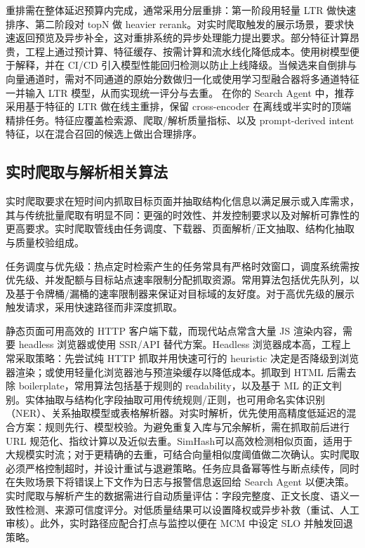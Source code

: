 重排需在整体延迟预算内完成，通常采用分层重排：第一阶段用轻量 LTR 做快速排序、第二阶段对 topN 做 heavier rerank。对实时爬取触发的展示场景，要求快速返回预览及异步补全，这对重排系统的异步处理能力提出要求。部分特征计算昂贵，工程上通过预计算、特征缓存、按需计算和流水线化降低成本。使用树模型便于解释，并在 CI/CD 引入模型性能回归检测以防止上线降级。当候选来自倒排与向量通道时，需对不同通道的原始分数做归一化或使用学习型融合器将多通道特征一并输入 LTR 模型，从而实现统一评分与去重。
在你的 Search Agent 中，推荐采用基于特征的 LTR 做在线主重排，保留 cross-encoder 在离线或半实时的顶端精排任务。特征应覆盖检索源、爬取/解析质量指标、以及 prompt-derived intent 特征，以在混合召回的候选上做出合理排序。

\subsection{实时爬取与解析相关算法}
实时爬取要求在短时间内抓取目标页面并抽取结构化信息以满足展示或入库需求，其与传统批量爬取有明显不同：更强的时效性、并发控制要求以及对解析可靠性的更高要求。实时爬取管线由任务调度、下载器、页面解析/正文抽取、结构化抽取与质量校验组成。

任务调度与优先级：热点定时检索产生的任务常具有严格时效窗口，调度系统需按优先级、并发配额与目标站点速率限制分配抓取资源\cite{shen2025scalable}。常用算法包括优先队列，以及基于令牌桶/漏桶的速率限制器来保证对目标域的友好度。对于高优先级的展示触发请求，采用快速路径而非深度抓取。

静态页面可用高效的 HTTP 客户端下载，而现代站点常含大量 JS 渲染内容，需要 headless 浏览器或使用 SSR/API 替代方案。Headless 浏览器成本高，工程上常采取策略：先尝试纯 HTTP 抓取并用快速可行的 heuristic 决定是否降级到浏览器渲染；或使用轻量化浏览器池与预渲染缓存以降低成本。抓取到 HTML 后需去除 boilerplate，常用算法包括基于规则的 readability，以及基于 ML 的正文判别\cite{liu2024neuscraper}。实体抽取与结构化字段抽取可用传统规则/正则，也可用命名实体识别（NER）、关系抽取模型或表格解析器\cite{bai2024schema}。对实时解析，优先使用高精度低延迟的混合方案：规则先行、模型校验。为避免重复入库与冗余解析，需在抓取前后进行 URL 规范化、指纹计算以及近似去重\cite{kumar2025benchmarking}。SimHash可以高效检测相似页面，适用于大规模实时流；对于更精确的去重，可结合向量相似度阈值做二次确认。实时爬取必须严格控制超时，并设计重试与退避策略\cite{shah2024veritas}。任务应具备幂等性与断点续传，同时在失败场景下将错误上下文作为日志与报警信息返回给 Search Agent 以便决策。实时爬取与解析产生的数据需进行自动质量评估：字段完整度、正文长度、语义一致性检测、来源可信度评分\cite{kahlon2025systematic}。对低质量结果可以设置降权或异步补救（重试、人工审核）。此外，实时路径应配合打点与监控以便在 MCM 中设定 SLO 并触发回退策略\cite{streamdaq2025}。

